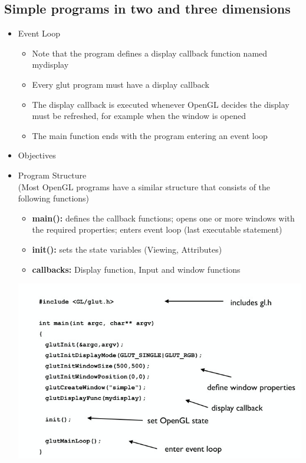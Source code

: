 \documentclass[11pt,a4paper]{article}
\begin{document}
	\subsection{Simple programs in two and three dimensions}
		\begin{itemize}
			\item  Event Loop
			\begin{itemize}
				\item Note that the program defines a display callback function named mydisplay
				\item Every glut program must have a display callback
				\item The display callback is executed whenever OpenGL decides the display must be refreshed, for example when the window is opened
				\item The main function ends with the program entering an event loop
			\end{itemize}
			\item Objectives
			\item Program Structure \\
				(Most OpenGL programs have a similar structure that consists of	the following functions)
				\begin{itemize}
					\item \textbf{main():} defines the callback functions; opens one or more windows with the required properties; enters event loop (last executable statement)	
					\item \textbf{init():} sets the state variables	(Viewing, Attributes)
					\item \textbf{callbacks:} Display function, Input and window functions
				\end{itemize}
			\begin{center}
				\includegraphics[scale=0.5]{pictures/exsampleglut.jpg}

\end{center}
\end{itemize}
\end{document}
